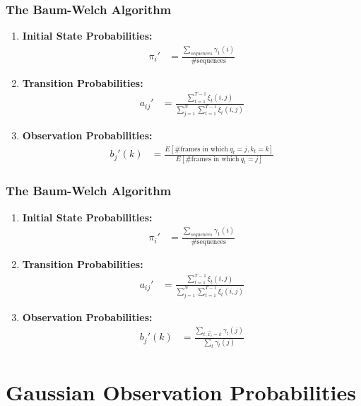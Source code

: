 \documentclass{beamer}
\begin{document}
\begin{frame}
  \frametitle{The Baum-Welch Algorithm}

  \begin{enumerate}
  \item {\bf Initial State Probabilities:}
    \begin{align*}
      \pi_i' &=\frac{\sum_{sequences} \gamma_1(i)}{\mbox{\# sequences}}
    \end{align*}
  \item {\bf Transition Probabilities:}
    \begin{align*}
      a_{ij}' &=\frac{\sum_{t=1}^{T-1} \xi_t(i,j)}{\sum_{j=1}^N\sum_{t=1}^{T-1}\xi_t(i,j)}
    \end{align*}
  \item {\bf Observation Probabilities:} 
    \begin{align*}
      b_{j}'(k) &=\frac{E\left[\mbox{\# frames in which}~q_{t}=j,k_t=k\right]}{E\left[\mbox{\# frames in which}~q_{t}=j\right]}
    \end{align*}
  \end{enumerate}
\end{frame}

\begin{frame}
  \frametitle{The Baum-Welch Algorithm}

  \begin{enumerate}
  \item {\bf Initial State Probabilities:}
    \begin{align*}
      \pi_i' &=\frac{\sum_{sequences} \gamma_1(i)}{\mbox{\# sequences}}
    \end{align*}
  \item {\bf Transition Probabilities:}
    \begin{align*}
      a_{ij}' &=\frac{\sum_{t=1}^{T-1} \xi_t(i,j)}{\sum_{j=1}^N\sum_{t=1}^{T-1}\xi_t(i,j)}
    \end{align*}
  \item {\bf Observation Probabilities:} 
    \begin{align*}
      b_{j}'(k) 
      &=\frac{\sum_{t:\vec{x}_t=k} \gamma_t(j)}{\sum_{t}\gamma_t(j)}
    \end{align*}
  \end{enumerate}
\end{frame}


\section[Gaussians]{Gaussian Observation Probabilities}
\setcounter{subsection}{1}
\end{document}
